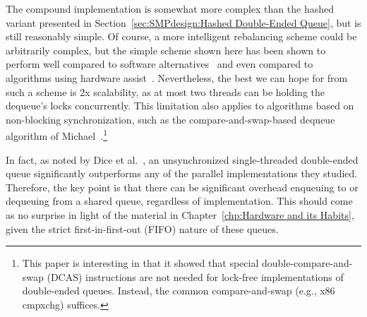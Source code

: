 The compound implementation is somewhat more complex than the
hashed variant presented in
Section~\ref{sec:SMPdesign:Hashed Double-Ended Queue},
but is still reasonably simple.
Of course, a more intelligent rebalancing scheme could be arbitrarily
complex, but the simple scheme shown here has been shown to
perform well compared to software
alternatives~\cite{LukeDalessandro:2011:ASPLOS:HybridNOrecSTM:deque}
and even compared to algorithms using hardware
assist~\cite{DavidDice:2010:SCA:HTM:deque}.
Nevertheless, the best we can hope for from such a scheme
is 2x scalability, as at most two threads can be holding the
dequeue's locks concurrently.
This limitation also applies to algorithms based on non-blocking
synchronization, such as the compare-and-swap-based dequeue algorithm of
Michael~\cite{DBLP:conf/europar/Michael03}.\footnote{
	This paper is interesting in that it showed that special
	double-compare-and-swap (DCAS) instructions are not needed
	for lock-free implementations of double-ended queues.
	Instead, the common compare-and-swap (e.g., x86 cmpxchg)
	suffices.}

\QuickQuizEnd

In fact, as noted by Dice et al.~\cite{DavidDice:2010:SCA:HTM:deque},
an unsynchronized single-threaded double-ended queue significantly
outperforms any of the parallel implementations they studied.
Therefore, the key point is that there can be significant overhead enqueuing to
or dequeuing from a shared queue, regardless of implementation.
This should come as no surprise in light of the material in
Chapter~\ref{chp:Hardware and its Habits}, given the strict
first-in-first-out (FIFO) nature of these queues.

